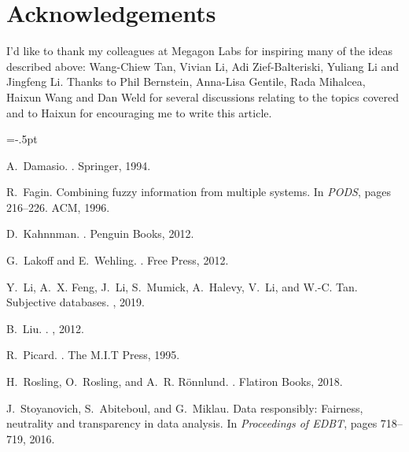 \documentclass[11pt]{article}
\begin{document}
\section{Acknowledgements}
I'd like to thank my colleagues at Megagon Labs for inspiring many of the ideas described above: Wang-Chiew Tan, Vivian Li, Adi Zief-Balteriski, Yuliang Li and Jingfeng Li. Thanks to Phil Bernstein,  Anna-Lisa Gentile, Rada Mihalcea,  Haixun Wang and Dan Weld for several discussions relating to the topics covered and to Haixun for encouraging me to write this article. 


\vspace{-.1cm}

\begin{thebibliography}{10}
\begin{small}

\itemsep=-.5pt

A.~Damasio.
.
\newblock Springer, 1994.

R.~Fagin.
\newblock Combining fuzzy information from multiple systems.
\newblock In {\em PODS}, pages 216--226. ACM, 1996.

D.~Kahnnman.
.
\newblock Penguin Books, 2012.

G.~Lakoff and E.~Wehling.
.
\newblock Free Press, 2012.

Y.~Li, A.~X. Feng, J.~Li, S.~Mumick, A.~Halevy, V.~Li, and W.-C. Tan.
\newblock Subjective databases.
, 2019.

B.~Liu.
.
, 2012.

R.~Picard.
.
\newblock The M.I.T Press, 1995.

H.~Rosling, O.~Rosling, and A.~R. R\"onnlund.
.
\newblock Flatiron Books, 2018.

J.~Stoyanovich, S.~Abiteboul, and G.~Miklau.
\newblock Data responsibly: Fairness, neutrality and transparency in data
  analysis.
\newblock In {\em Proceedings of EDBT}, pages 718--719, 2016.


\end{small}
\end{thebibliography}
\end{document}
